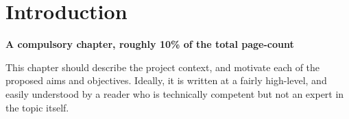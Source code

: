 \documentclass[ %
                    author={James Stephenson},
                supervisor={Dr. Edwin Simpson},
                    degree={MSc},
                     title={Bayesian Deep Learning For Extractive Test Summarisation},
                  subtitle={},
                      type={},
                      year={2023}]{dissertation}
\begin{document}
		
		
	
	\mainmatter
	
	
	\chapter{Introduction}
	\label{chap:introduction}
		
		{\bf A compulsory chapter, roughly 10\% of the total page-count}
		\vspace{1cm} 
		
		\noindent
		This chapter should describe the project context, and motivate each of
		the proposed aims and objectives.  Ideally, it is written at a fairly 
		high-level, and easily understood by a reader who is technically 
		competent but not an expert in the topic itself.
		
\end{document}
